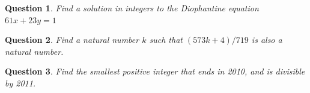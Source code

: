 \documentclass{article}
\newtheorem{question}{Question}
\begin{document}
\begin{question}Find a solution in integers to the Diophantine equation $61x + 23y = 1$\end{question}
\vspace*{\bigskipamount}

\begin{question}Find a natural number $k$ such that $(573k+4)/719$ is also a natural
number.\end{question}
\vspace*{\bigskipamount}

\begin{question}Find the smallest positive integer that ends in 2010, and is divisible by 2011.\end{question}
\vspace*{\bigskipamount}
\end{document}
